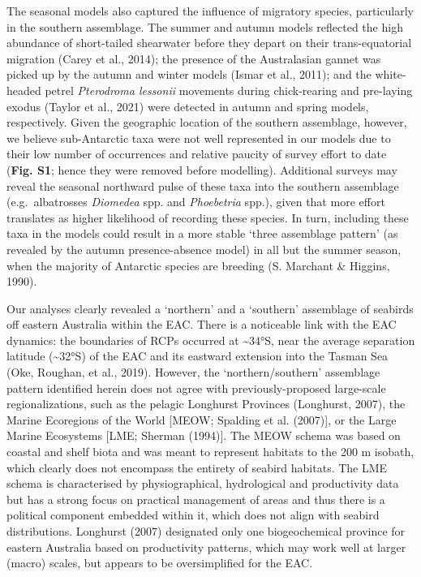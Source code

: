 \documentclass{article}
\begin{document}
The seasonal models also captured the influence of migratory species, particularly in the southern assemblage. The summer and autumn models reflected the high abundance of short-tailed shearwater before they depart on their trans-equatorial migration (Carey et al., 2014); the presence of the Australasian gannet was picked up by the autumn and winter models (Ismar et al., 2011); and the white-headed petrel \emph{Pterodroma lessonii} movements during chick-rearing and pre-laying exodus (Taylor et al., 2021) were detected in autumn and spring models, respectively. Given the geographic location of the southern assemblage, however, we believe sub-Antarctic taxa were not well represented in our models due to their low number of occurrences and relative paucity of survey effort to date (\textbf{Fig. S1}; hence they were removed before modelling). Additional surveys may reveal the seasonal northward pulse of these taxa into the southern assemblage (e.g.~albatrosses \emph{Diomedea} spp. and \emph{Phoebetria} spp.), given that more effort translates as higher likelihood of recording these species. In turn, including these taxa in the models could result in a more stable `three assemblage pattern' (as revealed by the autumn presence-absence model) in all but the summer season, when the majority of Antarctic species are breeding (S. Marchant \& Higgins, 1990).

Our analyses clearly revealed a `northern' and a `southern' assemblage of seabirds off eastern Australia within the EAC. There is a noticeable link with the EAC dynamics: the boundaries of RCPs occurred at \textasciitilde34°S, near the average separation latitude (\textasciitilde32°S) of the EAC and its eastward extension into the Tasman Sea (Oke, Roughan, et al., 2019). However, the `northern/southern' assemblage pattern identified herein does not agree with previously-proposed large-scale regionalizations, such as the pelagic Longhurst Provinces (Longhurst, 2007), the Marine Ecoregions of the World {[}MEOW; Spalding et al. (2007){]}, or the Large Marine Ecosystems {[}LME; Sherman (1994){]}. The MEOW schema was based on coastal and shelf biota and was meant to represent habitats to the 200 m isobath, which clearly does not encompass the entirety of seabird habitats. The LME schema is characterised by physiographical, hydrological and productivity data but has a strong focus on practical management of areas and thus there is a political component embedded within it, which does not align with seabird distributions. Longhurst (2007) designated only one biogeochemical province for eastern Australia based on productivity patterns, which may work well at larger (macro) scales, but appears to be oversimplified for the EAC.
\end{document}
